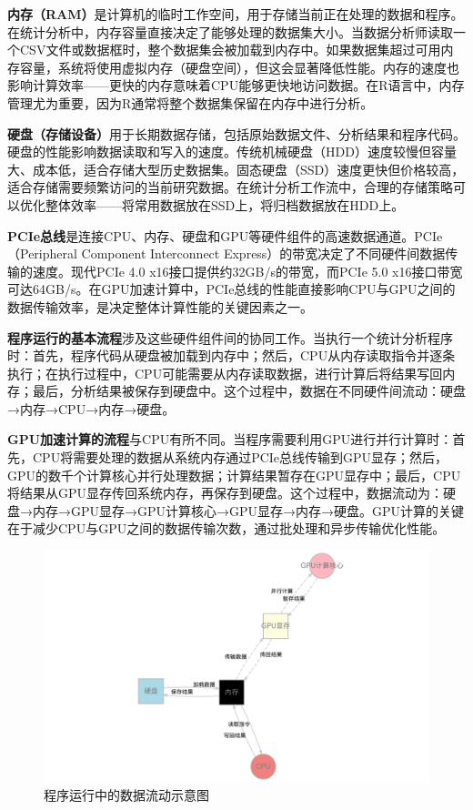 \documentclass[
]{book}
\begin{document}
\textbf{内存（RAM）}是计算机的临时工作空间，用于存储当前正在处理的数据和程序。在统计分析中，内存容量直接决定了能够处理的数据集大小。当数据分析师读取一个CSV文件或数据框时，整个数据集会被加载到内存中。如果数据集超过可用内存容量，系统将使用虚拟内存（硬盘空间），但这会显著降低性能。内存的速度也影响计算效率------更快的内存意味着CPU能够更快地访问数据。在R语言中，内存管理尤为重要，因为R通常将整个数据集保留在内存中进行分析。

\textbf{硬盘（存储设备）}用于长期数据存储，包括原始数据文件、分析结果和程序代码。硬盘的性能影响数据读取和写入的速度。传统机械硬盘（HDD）速度较慢但容量大、成本低，适合存储大型历史数据集。固态硬盘（SSD）速度更快但价格较高，适合存储需要频繁访问的当前研究数据。在统计分析工作流中，合理的存储策略可以优化整体效率------将常用数据放在SSD上，将归档数据放在HDD上。

\textbf{PCIe总线}是连接CPU、内存、硬盘和GPU等硬件组件的高速数据通道。PCIe（Peripheral Component Interconnect Express）的带宽决定了不同硬件间数据传输的速度。现代PCIe 4.0 x16接口提供约32GB/s的带宽，而PCIe 5.0 x16接口带宽可达64GB/s。在GPU加速计算中，PCIe总线的性能直接影响CPU与GPU之间的数据传输效率，是决定整体计算性能的关键因素之一。

\textbf{程序运行的基本流程}涉及这些硬件组件间的协同工作。当执行一个统计分析程序时：首先，程序代码从硬盘被加载到内存中；然后，CPU从内存读取指令并逐条执行；在执行过程中，CPU可能需要从内存读取数据，进行计算后将结果写回内存；最后，分析结果被保存到硬盘中。这个过程中，数据在不同硬件间流动：硬盘→内存→CPU→内存→硬盘。

\textbf{GPU加速计算的流程}与CPU有所不同。当程序需要利用GPU进行并行计算时：首先，CPU将需要处理的数据从系统内存通过PCIe总线传输到GPU显存；然后，GPU的数千个计算核心并行处理数据；计算结果暂存在GPU显存中；最后，CPU将结果从GPU显存传回系统内存，再保存到硬盘。这个过程中，数据流动为：硬盘→内存→GPU显存→GPU计算核心→GPU显存→内存→硬盘。GPU计算的关键在于减少CPU与GPU之间的数据传输次数，通过批处理和异步传输优化性能。

\begin{figure}

{\centering \includegraphics[width=0.8\linewidth]{imgs/hardware_flow} 

}

\caption{程序运行中的数据流动示意图}\label{fig:hardware-flow}
\end{figure}
\end{document}
